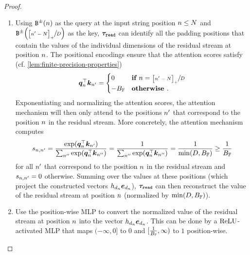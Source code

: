 \begin{proof}
\begin{enumerate}[label=(\arabic*)]
      In particular, combining the information in $\onehot{\dimidx_\stridx}$ with the information in the input symbols, the MLP can convert the one-hot encoding of the dimension $\dimidx_\stridx$ into the vector $\ehiddState_{\dimidx_\stridx} \ve_{\dimidx_\stridx}$, where $\ehiddState_{\dimidx_\stridx}$ corresponds to the value of the appropriate dimension of the residual stream at the appropriate position.
      \item Using $\sbinFun{\stridx}$ as the query at the input string position ${{n}} \leq {{N}}$ and $\sbinFun{\sfrac{\posPart{\stridx' - \strlen}}{\hiddDim}}$ as the key, ${{{{\boldsymbol{\tau}}}_{\texttt{read}}}}$ can identify all the padding positions that contain the values of the individual dimensions of the residual stream at position ${{n}}$.
      The positional encodings ensure that the attention scores satisfy (cf. \cref{lem:finite-precision-properties})
      \begin{equation}
         {{{{{\bm{q}}}}_{{{n}}}^\top {{{\bm{k}}}}_{{{n}}'}}} = \begin{cases}
            0 & \textbf{if } {{n}} = \sfrac{{\left[ {{n}}' - {{N}} \right]_{+}}}{{{D}}} \\
            -{{B_{{{\mathbb{F}}}}}} & \textbf{otherwise }.
         \end{cases}
      \end{equation}
      Exponentiating and normalizing the attention scores, the attention mechanism will then only attend to the positions ${{n}}'$ that correspond to the position ${{n}}$ in the residual stream.
      More concretely, the attention mechanism computes
      \begin{equation}
         \evs_{\stridx, \stridx'} = \frac{\exp(\inner{\vq_{\stridx}}{\vk_{\stridx'}})}{\sum_{\stridx''} \exp(\inner{\vq_{\stridx}}{\vk_{\stridx''}})} = \frac{1}{\sum_{\stridx''} \exp(\inner{\vq_{\stridx}}{\vk_{\stridx''}})} = \frac{1}{\min\mleft(\hiddDim, \maxFNum\mright)} \geq \frac{1}{\maxFNum}
      \end{equation}
      for all ${{n}}'$ that correspond to the position ${{n}}$ in the residual stream and ${{{s}}}_{{{n}}, {{n}}'} = 0$ otherwise.
      Summing over the values at these positions (which project the constructed vectors $\ehiddState_{\dimidx_\stridx} \ve_{\dimidx_\stridx}$), ${{{{\boldsymbol{\tau}}}_{\texttt{read}}}}$ can then reconstruct the value of the residual stream at position ${{n}}$ (normalized by $\min\mleft(\hiddDim, \maxFNum\mright)$).
      \item Use the position-wise MLP to convert the normalized value of the residual stream at position ${{n}}$ into the vector $\ehiddState_{\dimidx_\stridx} \ve_{\dimidx_\stridx}$.
      This can be done by a ${{\mathrm{ReLU}}}$-activated MLP that maps $(-\infty, 0]$ to $0$ and $[\frac{1}{{{B_{{{\mathbb{F}}}}}}}, \infty)$ to $1$ position-wise.
   \end{enumerate}
\end{proof}



